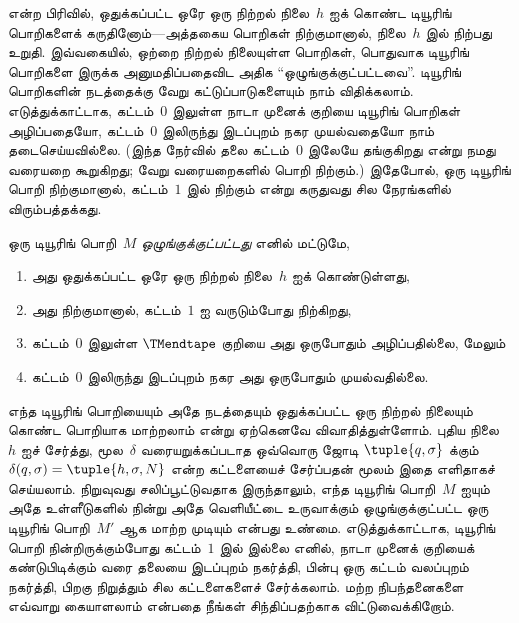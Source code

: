 \documentclass[../../../include/open-logic-section]{subfiles}
\begin{document}


\begin{explain}
 என்ற பிரிவில், ஒதுக்கப்பட்ட ஒரே ஒரு நிற்றல்
நிலை~$h$ ஐக் கொண்ட டியூரிங் பொறிகளைக் கருதினோம்---அத்தகைய பொறிகள்
நிற்குமானால், நிலை~$h$ இல் நிற்பது உறுதி. இவ்வகையில், ஒற்றை நிற்றல்
நிலையுள்ள பொறிகள், பொதுவாக டியூரிங் பொறிகளை இருக்க அனுமதிப்பதைவிட
அதிக ``ஒழுங்குக்குட்பட்டவை''. டியூரிங் பொறிகளின் நடத்தைக்கு வேறு
கட்டுப்பாடுகளையும் நாம் விதிக்கலாம். எடுத்துக்காட்டாக, கட்டம்~$0$
இலுள்ள நாடா முனைக் குறியை டியூரிங் பொறிகள் அழிப்பதையோ, கட்டம்~$0$
இலிருந்து இடப்புறம் நகர முயல்வதையோ நாம் தடைசெய்யவில்லை. (இந்த
நேர்வில் தலை கட்டம்~$0$ இலேயே தங்குகிறது என்று நமது வரையறை
கூறுகிறது; வேறு வரையறைகளில் பொறி நிற்கும்.) இதேபோல், ஒரு டியூரிங்
பொறி நிற்குமானால், கட்டம்~$1$ இல் நிற்கும் என்று கருதுவது சில
நேரங்களில் விரும்பத்தக்கது.
\end{explain}

\begin{defn}
ஒரு டியூரிங் பொறி~$M$ \emph{ஒழுங்குக்குட்பட்டது} எனில் மட்டுமே,
\begin{enumerate}
    \item அது ஒதுக்கப்பட்ட ஒரே ஒரு நிற்றல் நிலை~$h$ ஐக் கொண்டுள்ளது,
    \item அது நிற்குமானால், கட்டம்~$1$ ஐ வருடும்போது நிற்கிறது,
    \item கட்டம்~$0$ இலுள்ள $\TMendtape$ குறியை அது ஒருபோதும் அழிப்பதில்லை, மேலும்
    \item கட்டம்~$0$ இலிருந்து இடப்புறம் நகர அது ஒருபோதும் முயல்வதில்லை.
\end{enumerate}
\end{defn}

\begin{explain}
எந்த டியூரிங் பொறியையும் அதே நடத்தையும் ஒதுக்கப்பட்ட ஒரு நிற்றல்
நிலையும் கொண்ட பொறியாக மாற்றலாம் என்று ஏற்கெனவே விவாதித்துள்ளோம்.
புதிய நிலை~$h$ ஐச் சேர்த்து, மூல~$\delta$ வரையறுக்கப்படாத ஒவ்வொரு
ஜோடி $\tuple{q,\sigma}$ க்கும்
$\delta(q, \sigma) = \tuple{h, \sigma, N}$ என்ற கட்டளையைச் சேர்ப்பதன்
மூலம் இதை எளிதாகச் செய்யலாம். நிறுவுவது சலிப்பூட்டுவதாக இருந்தாலும்,
எந்த டியூரிங் பொறி~$M$ ஐயும் அதே உள்ளீடுகளில் நின்று அதே வெளியீட்டை
உருவாக்கும் ஒழுங்குக்குட்பட்ட ஒரு டியூரிங் பொறி~$M'$ ஆக மாற்ற முடியும்
என்பது உண்மை. எடுத்துக்காட்டாக, டியூரிங் பொறி நின்றிருக்கும்போது
கட்டம்~$1$ இல் இல்லை எனில், நாடா முனைக் குறியைக் கண்டுபிடிக்கும் வரை
தலையை இடப்புறம் நகர்த்தி, பின்பு ஒரு கட்டம் வலப்புறம் நகர்த்தி,
பிறகு நிறுத்தும் சில கட்டளைகளைச் சேர்க்கலாம். மற்ற நிபந்தனைகளை
எவ்வாறு கையாளலாம் என்பதை நீங்கள் சிந்திப்பதற்காக விட்டுவைக்கிறோம்.
\end{explain}
\end{document}
